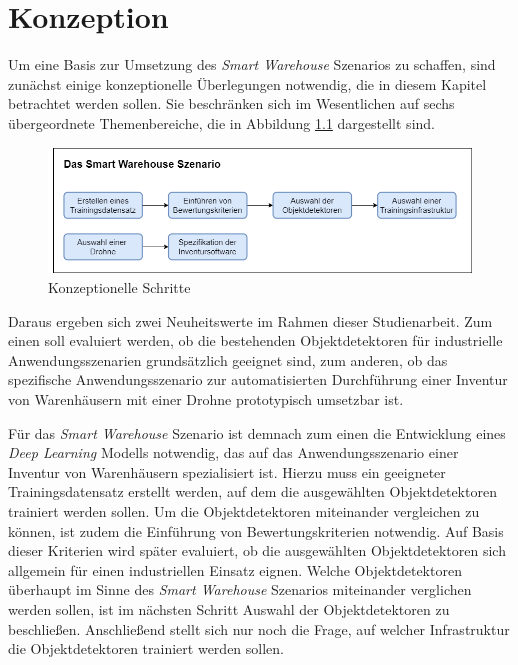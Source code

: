 \chapter{Konzeption}

Um eine Basis zur Umsetzung des \textit{Smart Warehouse} Szenarios zu schaffen, sind zunächst einige konzeptionelle Überlegungen notwendig, die in diesem Kapitel betrachtet werden sollen. Sie beschränken sich im Wesentlichen auf sechs übergeordnete Themenbereiche, die in Abbildung \ref{schritte} dargestellt sind. 

\begin{figure}[ht]
	\begin{center}
		\includegraphics[width=15cm]{Bilder/blockdiagramm.png} 
		\caption[Konzeptionelle Schritte]{Konzeptionelle Schritte}
		\label{schritte}
	\end{center}
\end{figure}

Daraus ergeben sich zwei Neuheitswerte im Rahmen dieser Studienarbeit. Zum einen soll evaluiert werden, ob die bestehenden Objektdetektoren für industrielle Anwendungsszenarien grundsätzlich geeignet sind, zum anderen, ob das spezifische Anwendungsszenario zur automatisierten Durchführung einer Inventur von Warenhäusern mit einer Drohne prototypisch umsetzbar ist.

Für das \textit{Smart Warehouse} Szenario ist demnach zum einen die Entwicklung eines \textit{Deep Learning} Modells notwendig, das auf das Anwendungsszenario einer Inventur von Warenhäusern spezialisiert ist. Hierzu muss ein geeigneter Trainingsdatensatz erstellt werden, auf dem die ausgewählten Objektdetektoren trainiert werden sollen. Um die Objektdetektoren miteinander vergleichen zu können, ist zudem die Einführung von Bewertungskriterien notwendig. Auf Basis dieser Kriterien wird später evaluiert, ob die ausgewählten Objektdetektoren sich allgemein für einen industriellen Einsatz eignen. Welche Objektdetektoren überhaupt im Sinne des \textit{Smart Warehouse} Szenarios miteinander verglichen werden sollen, ist im nächsten Schritt \glqq Auswahl der Objektdetektoren\grqq{} zu beschließen. Anschließend stellt sich nur noch die Frage, auf welcher Infrastruktur die Objektdetektoren trainiert werden sollen.

